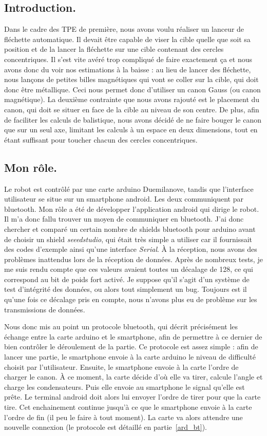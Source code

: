 \subsection{Introduction.}
Dans le cadre des TPE de première, nous avons voulu réaliser un lanceur de fléchette automatique. Il devait être capable de viser la cible quelle que soit sa position et de la lancer la fléchette sur une cible contenant des cercles concentriques. Il s'est vite avéré trop compliqué de faire exactement ça et nous avons donc du voir nos estimations à la baisse : au lieu de lancer des fléchette, nous lançons de petites billes magnétiques qui vont se coller sur la cible, qui doit donc être métallique. Ceci nous permet donc d'utiliser un canon Gauss (ou canon magnétique). La deuxième contrainte que nous avons rajouté est le placement du canon, qui doit se situer en face de la cible au niveau de son centre. De plus, afin de faciliter les calculs de balistique, nous avons décidé de ne faire bouger le canon que sur un seul axe, limitant les calculs à un espace en deux dimensions, tout en étant suffisant pour toucher chacun des cercles concentriques.

\subsection{Mon rôle.}
Le robot est contrôlé par une carte arduino Duemilanove, tandis que l'interface utilisateur se situe sur un smartphone android. Les deux communiquent par bluetooth. Mon rôle a été de développer l'application android qui dirige le robot. Il m'a donc fallu trouver un moyen de communiquer en bluetooth. J'ai donc chercher et comparé un certain nombre de shields bluetooth pour arduino avant de choisir un shield \emph{seeedstudio}, qui était très simple a utiliser car il fournissait des codes d'exemple ainsi qu'une interface \emph{Serial}. À la réception, nous avons des problèmes inattendus lors de la réception de données. Après de nombreux tests, je me suis rendu compte que ces valeurs avaient toutes un décalage de 128, ce qui correspond au bit de poids fort activé. Je suppose qu'il s'agit d'un système de test d'intégrité des données, ou alors tout simplement un bug. Toujours est il qu'une fois ce décalage pris en compte, nous n'avons plus eu de problème sur les transmissions de données.

Nous donc mis au point un protocole bluetooth, qui décrit précisément les échange entre la carte arduino et le smartphone, afin de permettre à ce dernier de bien contrôler le déroulement de la partie. Ce protocole est assez simple : afin de lancer une partie, le smartphone envoie à la carte arduino le niveau de difficulté choisit par l'utilisateur. Ensuite, le smartphone envoie à la carte l'ordre de charger le canon. À ce moment, la carte décide d'où elle va tirer, calcule l'angle et charge les condensateurs. Puis elle envoie au smartphone le signal qu'elle est prête. Le terminal android doit alors lui envoyer l'ordre de tirer pour que la carte tire. Cet enchainement continue jusqu'à ce que le smartphone envoie à la carte l'ordre de fin (il peu le faire à tout moment). La carte va alors attendre une nouvelle connexion (le protocole est détaillé en partie~\ref{ard_bt}).

